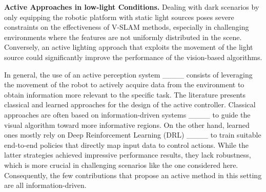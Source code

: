 

\textbf{Active Approaches in low-light Conditions.}
Dealing with dark scenarios by only equipping the robotic platform with static light sources poses severe constraints on the effectiveness of V-SLAM methods, especially in challenging environments where the features are not uniformly distributed in the scene. Conversely, an active lighting approach that exploits the movement of the light source could significantly improve the performance of the vision-based algorithms. %

In general, the use of an active perception system ____ consists of leveraging the movement of the robot to actively acquire data from the environment to obtain information more relevant to the specific task. 
The literature presents classical and learned approaches for the design of the active controller. Classical approaches are often based on information-driven systems ____ to guide the visual algorithm toward more informative regions. On the other hand, learned ones mostly rely on Deep Reinforcement Learning (DRL) ____ to train suitable end-to-end policies that directly map input data to control actions. While the latter strategies achieved impressive performance results, they lack robustness, which is more crucial in challenging scenarios like the one considered here. Consequently, the few contributions that propose an active method in this setting are all information-driven.


